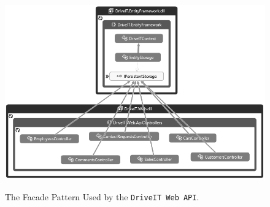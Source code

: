 \begin{figure}[H]
	\centering
	\includegraphics[width=\textwidth]{Figures/FacadeKindOfPattern}\\
	\caption{The Facade Pattern Used by the \texttt{DriveIT Web API}.}
	\label{fig:The Facade Pattern Used by the DriveIT Web API.}
\end{figure}
